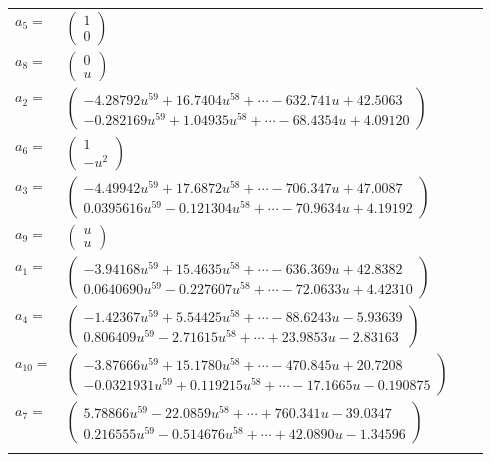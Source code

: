 \documentclass[1p]{elsarticle_modified}
\theoremstyle{definition}
\begin{document}
\begin{tabular}{m{7pt} m{180pt} m{7pt} m{180pt} }
\flushright $a_{5}=$&$\begin{pmatrix}1\\0\end{pmatrix}$ \\
\flushright $a_{8}=$&$\begin{pmatrix}0\\u\end{pmatrix}$ \\
\flushright $a_{2}=$&$\begin{pmatrix}-4.28792 u^{59}+16.7404 u^{58}+\cdots-632.741 u+42.5063\\-0.282169 u^{59}+1.04935 u^{58}+\cdots-68.4354 u+4.09120\end{pmatrix}$ \\
\flushright $a_{6}=$&$\begin{pmatrix}1\\- u^2\end{pmatrix}$ \\
\flushright $a_{3}=$&$\begin{pmatrix}-4.49942 u^{59}+17.6872 u^{58}+\cdots-706.347 u+47.0087\\0.0395616 u^{59}-0.121304 u^{58}+\cdots-70.9634 u+4.19192\end{pmatrix}$ \\
\flushright $a_{9}=$&$\begin{pmatrix}u\\u\end{pmatrix}$ \\
\flushright $a_{1}=$&$\begin{pmatrix}-3.94168 u^{59}+15.4635 u^{58}+\cdots-636.369 u+42.8382\\0.0640690 u^{59}-0.227607 u^{58}+\cdots-72.0633 u+4.42310\end{pmatrix}$ \\
\flushright $a_{4}=$&$\begin{pmatrix}-1.42367 u^{59}+5.54425 u^{58}+\cdots-88.6243 u-5.93639\\0.806409 u^{59}-2.71615 u^{58}+\cdots+23.9853 u-2.83163\end{pmatrix}$ \\
\flushright $a_{10}=$&$\begin{pmatrix}-3.87666 u^{59}+15.1780 u^{58}+\cdots-470.845 u+20.7208\\-0.0321931 u^{59}+0.119215 u^{58}+\cdots-17.1665 u-0.190875\end{pmatrix}$ \\
\flushright $a_{7}=$&$\begin{pmatrix}5.78866 u^{59}-22.0859 u^{58}+\cdots+760.341 u-39.0347\\0.216555 u^{59}-0.514676 u^{58}+\cdots+42.0890 u-1.34596\end{pmatrix}$\\&\end{tabular}
\end{document}
